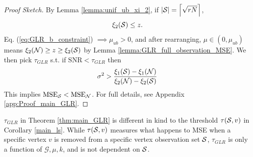 {\begin{theorem}
\end{theorem}
\begin{proof}[Proof Sketch] By Lemma \ref{lemma:unif_ub_xi_2},  if $|\mathcal{S}| = \left\lceil\sqrt{rN}\right\rceil$,
\begin{equation}
\xi_{2}(\mathcal{S}) \leq z.
\end{equation}
Eq. (\ref{eq:GLR_b_constraint}) $\implies \mu_{ub} > 0$, and after rearranging, $\mu \in (0,\mu_{ub})$ means $\xi_{2}(\mathcal{N}) \geq z \geq \xi_{2}(\mathcal{S})$ by Lemma \ref{lemma:GLR_full_observation_MSE}. We then pick $\tau_{GLR}$ s.t. if $\textrm{SNR} < \tau_{GLR}$ then
\begin{equation}
    \sigma^{2} > \frac{\xi_{1}(\mathcal{S}) - \xi_{1}(\mathcal{N})}{\xi_{2}(\mathcal{N}) - \xi_{2}(\mathcal{S})}
\end{equation}
This implies $\textrm{MSE}_{\mathcal{S}} < \textrm{MSE}_{\mathcal{N}}$.
For full details, see Appendix \ref{app:Proof_main_GLR}.
\end{proof}

\fi
\iffalse
\begin{remark}
    $\tau_{GLR}$ in Theorem \ref{thm:main_GLR} is different in kind to the threshold $\tau(\mathcal{S},v)$ in Corollary \ref{main_ls}. While $\tau(\mathcal{S},v)$ measures what happens to MSE when a specific vertex $v$ is removed from a specific vertex observation set $\mathcal{S}$, $\tau_{GLR}$ is only a function of $\mathcal{G}, \mu, k$, and is not dependent on $\mathcal{S}$.


\end{remark}}
